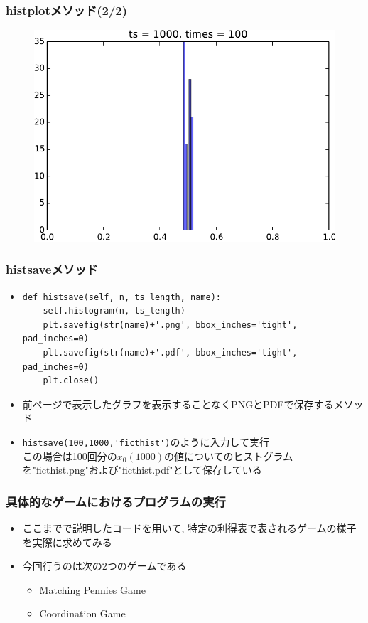 \documentclass[dvipdfmx,fleqn,handout]{beamer}
\begin{document}
\begin{frame}
\frametitle{histplotメソッド(2/2)}
\begin{figure}
 \centering
 \includegraphics[width=\linewidth]{histogram2.pdf}
 \label{fig:matchingpennies_plot}
\end{figure}
\end{frame}

\begin{frame}[fragile]%
\frametitle{histsaveメソッド}
\begin{itemize}\setlength{\parskip}{0.5em}
\item
\scriptsize
\begin{verbatim}
def histsave(self, n, ts_length, name):
    self.histogram(n, ts_length)
    plt.savefig(str(name)+'.png', bbox_inches='tight', pad_inches=0)
    plt.savefig(str(name)+'.pdf', bbox_inches='tight', pad_inches=0)
    plt.close()
\end{verbatim}
\normalsize
\item
前ページで表示したグラフを表示することなくPNGとPDFで保存するメソッド\pause
\item
\verb|histsave(100,1000,'ficthist')|のように入力して実行\pause\\
この場合は100回分の$x_0(1000)$の値についてのヒストグラムを"ficthist.png"および"ficthist.pdf"として保存している
\end{itemize}
\end{frame}



\begin{frame}
\frametitle{具体的なゲームにおけるプログラムの実行}
\begin{itemize}\setlength{\parskip}{0.5em}
\item
ここまでで説明したコードを用いて, 特定の利得表で表されるゲームの様子を実際に求めてみる
\item
今回行うのは次の2つのゲームである\pause
\begin{itemize}\setlength{\parskip}{0.5em}
\item
Matching Pennies Game
\item
Coordination Game
\end{itemize}
\end{itemize}
\end{frame}
\end{document}

